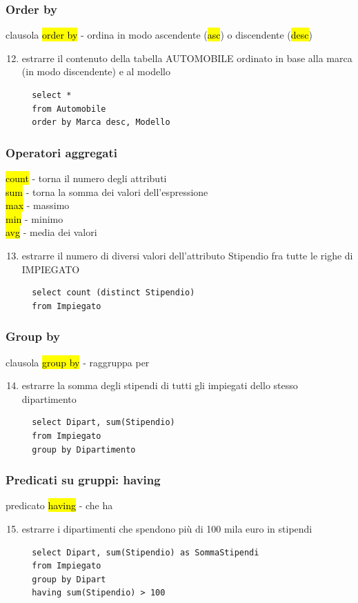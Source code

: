 \documentclass[a4paper]{article}
\begin{document}
\subsubsection{Order by}
clausola \hl{order by} - ordina in modo ascendente (\hl{asc}) o discendente (\hl{desc})
\begin{enumerate}[leftmargin=*]
  \setcounter{enumi}{11}
  \item estrarre il contenuto della tabella AUTOMOBILE ordinato in base alla marca (in modo discendente) e al modello
  \begin{verbatim}
  select *
  from Automobile
  order by Marca desc, Modello
  \end{verbatim}
\end{enumerate}

\subsubsection{Operatori aggregati}
\hl{count} - torna il numero degli attributi\\
\hl{sum} - torna la somma dei valori dell’espressione\\
\hl{max} - massimo\\
\hl{min} - minimo\\
\hl{avg} - media dei valori
\begin{enumerate}[leftmargin=*]
  \setcounter{enumi}{12}
  \item estrarre il numero di diversi valori dell’attributo Stipendio fra tutte le righe di IMPIEGATO
  \begin{verbatim}
  select count (distinct Stipendio)
  from Impiegato
  \end{verbatim}
\end{enumerate}

\subsubsection{Group by}
clausola \hl{group by} - raggruppa per
\begin{enumerate}[leftmargin=*]
  \setcounter{enumi}{13}
  \item estrarre la somma degli stipendi di tutti gli impiegati dello stesso dipartimento
  \begin{verbatim}
  select Dipart, sum(Stipendio)
  from Impiegato
  group by Dipartimento
  \end{verbatim}
\end{enumerate}

\subsubsection{Predicati su gruppi: having}
predicato \hl{having} - che ha
\begin{enumerate}[leftmargin=*]
  \setcounter{enumi}{14}
  \item estrarre i dipartimenti che spendono più di 100 mila euro in stipendi
  \begin{verbatim}
  select Dipart, sum(Stipendio) as SommaStipendi
  from Impiegato
  group by Dipart
  having sum(Stipendio) > 100
  \end{verbatim}
\end{enumerate}
\end{document}
